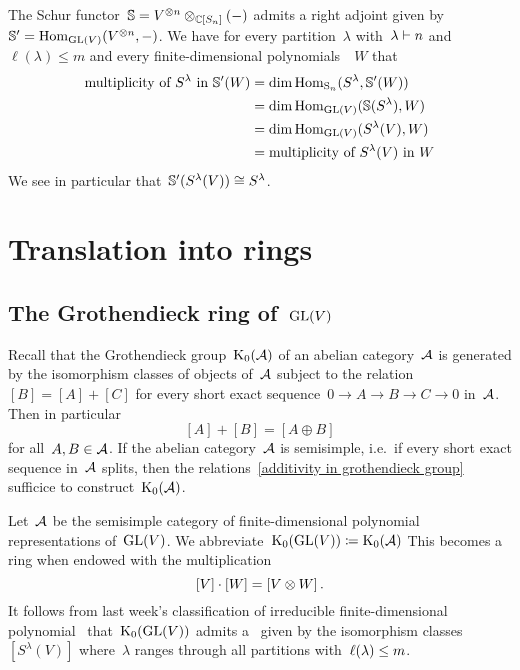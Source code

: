 \documentclass[a4paper,10pt]{scrartcl}
\begin{document}
\begin{remark}
  The Schur functor~$\mathbb{S} = V^{\otimes n} \otimes_{\mathbb{C}[S_n]} (-)$ admits a right adjoint given by~$\mathbb{S}' = \operatorname{Hom}_{\operatorname{GL}(V)}(V^{\otimes n}, -)$.
  We have for every partition~$\lambda$ with~$\lambda \vdash n$ and~$\ell(\lambda) \leq m$ and every finite-dimensional polynomials~{}~$W$ that
  \begin{align*}
    \text{multiplicity of~$S^\lambda$ in~$\mathbb{S}'(W)$}
    &=
    \dim \operatorname{Hom}_{\operatorname{S}_n}(S^\lambda, \mathbb{S}'(W))
    \\
    &=
    \dim \operatorname{Hom}_{\operatorname{GL}(V)}(\mathbb{S}(S^\lambda), W)
    \\
    &=
    \dim \operatorname{Hom}_{\operatorname{GL}(V)}(S^\lambda(V), W)
    \\
    &=
    \text{multiplicity of~$S^\lambda(V)$ in~$W$}
  \end{align*}
  We see in particular that~$\mathbb{S}'(S^\lambda(V)) \cong S^\lambda$.
\end{remark}





\section{Translation into rings}



\subsection{The Grothendieck ring of~$\operatorname{GL}(V)$}

Recall that the Grothendieck group~$\operatorname{K}_0(\mathcal{A})$ of an abelian category~$\mathcal{A}$ is generated by the isomorphism classes of objects of~$\mathcal{A}$ subject to the relation~$[B] = [A] + [C]$ for every short exact sequence~$0 \to A \to B \to C \to 0$ in~$\mathcal{A}$.
Then in particular
\begin{equation}
  \label{additivity in grothendieck group}
  [A] + [B] = [A \oplus B]
\end{equation}
for all~$A, B \in \mathcal{A}$.
If the abelian category~$\mathcal{A}$ is semisimple, i.e.\ if every short exact sequence in~$\mathcal{A}$ splits, then the relations~\eqref{additivity in grothendieck group} sufficice to construct~$\operatorname{K}_0(\mathcal{A})$.

Let~$\mathcal{A}$ be the semisimple category of finite-dimensional polynomial representations of~$\operatorname{GL}(V)$.
We abbreviate~$\operatorname{K}_0(\operatorname{GL}(V)) \coloneqq \operatorname{K}_0(\mathcal{A})$
This becomes a ring when endowed with the multiplication
\[
  [V] \cdot [W]
  =
  [V \otimes W] \,.
\]
It follows from last week’s classification of irreducible finite-dimensional polynomial~{} that~$\operatorname{K}_0(\operatorname{GL}(V))$ admits a~{\basis{$\Integer$}} given by the isomorphism classes~$[S^\lambda(V)]$ where~$\lambda$ ranges through all partitions with~$\operatorname{\ell}(\lambda) \leq m$.
\end{document}
